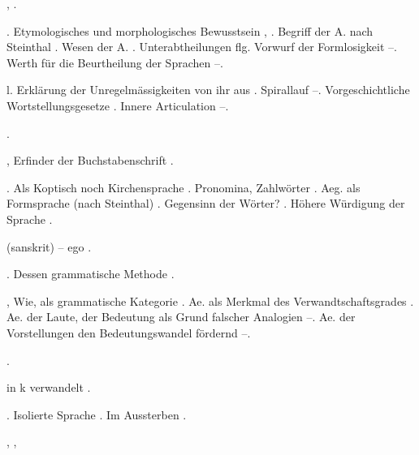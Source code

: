 \begin{register}
 \pageref{sp.160}, \pageref{sp.282}.

. Etymologisches und morphologisches Bewusstsein \pageref{sp.124}, \pageref{sp.384}. Begriff der A. nach Steinthal \pageref{sp.337}. Wesen der A. \pageref{sp.345}. Unterabtheilungen \pageref{sp.349} flg. Vorwurf der Formlosigkeit \pageref{sp.396}–\pageref{sp.397}. Werth für die Beurtheilung der Sprachen \pageref{sp.403}–\pageref{sp.404}.


 l\pageref{sp.80}. Erklärung der Unregelmässigkeiten von ihr aus \pageref{sp.211}. Spirallauf \pageref{sp.255}–\pageref{sp.258}. Vorgeschichtliche Wortstellungsgesetze \pageref{sp.365}. Innere Articulation \pageref{sp.434}–\pageref{sp.436}.

 \pageref{sp.122}\sed{, \pageref{sp.349}}.

, Erfinder der Buchstabenschrift \pageref{sp.19}.

 \pageref{sp.142}. Als Koptisch noch Kirchensprache \pageref{sp.146}. Pronomina, Zahlwörter \pageref{sp.161}. Aeg. als Formsprache (nach Steinthal) \pageref{sp.336}.  Gegensinn der Wörter? \pageref{sp.380}. Höhere Würdigung der Sprache \pageref{sp.389}.

 (sanskrit) – ego \pageref{sp.214}.

. Dessen grammatische Methode \pageref{sp.110}.

, Wie, als grammatische Kategorie \pageref{sp.104}. Ae. als Merkmal des Verwandtschaftsgrades  \pageref{sp.159}. Ae. der Laute, der Bedeutung als Grund falscher Analogien \pageref{sp.211}–\pageref{sp.212}. Ae. der Vorstellungen den Bedeutungswandel fördernd \pageref{sp.232}–\pageref{sp.234}.

 \pageref{sp.149}\sed{, \pageref{sp.251}, \pageref{sp.426}}.

{\ain} in k verwandelt \pageref{sp.314}.

. Isolierte Sprache \pageref{sp.147}. Im Aussterben \pageref{sp.261}. 


, \pageref{sp.149}, 


\end{register}
